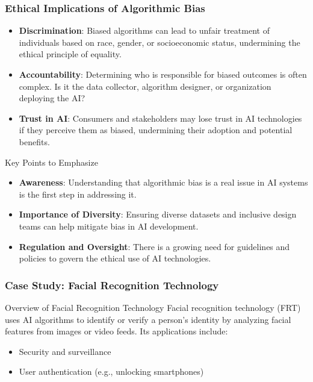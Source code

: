 \documentclass[aspectratio=169]{beamer}
\begin{document}
\begin{frame}[fragile]
    \frametitle{Ethical Implications of Algorithmic Bias}
    \begin{itemize}
        \item \textbf{Discrimination}: Biased algorithms can lead to unfair treatment of individuals based on race, gender, or socioeconomic status, undermining the ethical principle of equality.
        
        \item \textbf{Accountability}: Determining who is responsible for biased outcomes is often complex. Is it the data collector, algorithm designer, or organization deploying the AI?
        
        \item \textbf{Trust in AI}: Consumers and stakeholders may lose trust in AI technologies if they perceive them as biased, undermining their adoption and potential benefits.
    \end{itemize}
    
    \begin{block}{Key Points to Emphasize}
        \begin{itemize}
            \item \textbf{Awareness}: Understanding that algorithmic bias is a real issue in AI systems is the first step in addressing it.
            \item \textbf{Importance of Diversity}: Ensuring diverse datasets and inclusive design teams can help mitigate bias in AI development.
            \item \textbf{Regulation and Oversight}: There is a growing need for guidelines and policies to govern the ethical use of AI technologies.
        \end{itemize}
    \end{block}
\end{frame}

\begin{frame}[fragile]
    \frametitle{Case Study: Facial Recognition Technology}
    \begin{block}{Overview of Facial Recognition Technology}
        Facial recognition technology (FRT) uses AI algorithms to identify or verify a person's identity by analyzing facial features from images or video feeds. Its applications include:
        \begin{itemize}
            \item Security and surveillance
            \item User authentication (e.g., unlocking smartphones)
        \end{itemize}
    \end{block}
\end{frame}
\end{document}
